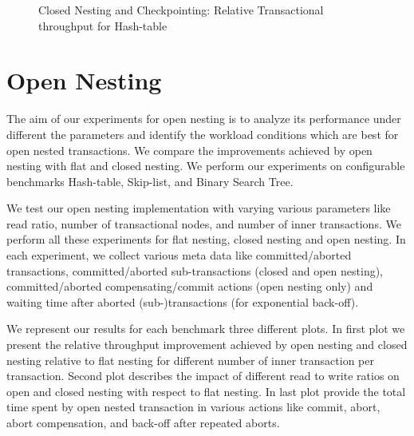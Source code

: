 \documentclass[12pt,english]{report}
\begin{document}
\begin{figure}[H]
\centering
{}
\end{figure}
\begin{figure}[H]
\centering
{}
\end{figure}
\begin{figure}[H]
\centering
{}
\caption{Closed Nesting and Checkpointing: Relative Transactional throughput for Hash-table}
\label{Fig:cpHashTable}
\end{figure}

\section{Open Nesting}

The aim of our experiments for open nesting is to analyze its performance under different the parameters  and identify the workload conditions which are best for open nested transactions. We compare the improvements achieved by open nesting with flat and closed nesting. We perform our experiments on configurable benchmarks Hash-table, Skip-list, and Binary Search Tree.

We test our open nesting implementation with varying various parameters like read ratio, number of transactional nodes, and number of inner transactions. We perform all these experiments for flat nesting, closed nesting and open nesting. In each experiment, we collect various meta data like committed/aborted transactions, committed/aborted sub-transactions (closed and open nesting), committed/aborted compensating/commit actions (open nesting only) and waiting time after aborted (sub-)transactions (for exponential back-off).

We represent our results for each benchmark three different plots. In first plot we present the relative throughput improvement achieved by open nesting and closed nesting relative to flat nesting for different number of inner transaction per transaction. Second plot describes the impact of different read to write ratios on open and closed nesting with respect to flat nesting. In last plot provide the total time spent by open nested transaction in various actions like commit, abort, abort compensation, and back-off after repeated aborts. 
\end{document}
